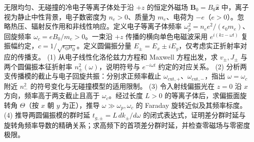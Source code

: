 无限均匀、无碰撞的冷电子等离子体处于沿 \(+z\) 的恒定外磁场 \(\mathbf B_0=B_0\hat{\mathbf z}\) 中，离子视为静止中性背景，电子数密度为 \(n_e>0\)、质量为 \(m_e\)、电荷为 \(-e\)（\(e>0\)）。忽略热压、辐射反作用和非线性响应。定义电子等离子体频率 \(\omega_p^2=n_e e^2/(\epsilon_0m_e)\)、回旋频率 \(\omega_c=eB_0/m_e>0\)。一束沿 \(+z\) 传播的横向单色电磁波采用 \(e^{i(kz-\omega t)}\) 复振幅约定，\(c=1/\sqrt{\epsilon_0\mu_0}\)。定义圆偏振分量 \(E_\pm=E_x\pm iE_y\)，仅考虑实正折射率对应的传播支。
(1) 从电子线性化洛伦兹力方程和 Maxwell 方程出发，求 \(v_\pm,J_\pm\) 与两个圆偏振本征折射率 \(n_\pm^2(\omega)\)，说明符号与 \(e^{-i\omega t}\) 约定的对应关系。
(2) 分析两支传播模的截止与电子回旋共振：分别求正频率截止 \(\omega_{\mathrm{cut},+}\)、\(\omega_{\mathrm{cut},-}\)，指出 \(\omega=\omega_c\) 附近 \(n_-^2\) 的符号变化与无碰撞模型的适用限制。
(3) 令入射线偏振光在 \(z=0\) 沿 \(x\) 方向，频率高于两支截止且高于 \(\omega_c\)。经过长度 \(L>0\) 的等离子体后，求偏振面旋转角 \(\Theta\)（按 \(x\) 朝 \(y\) 为正），推导 \(\omega\gg\omega_p,\omega_c\) 的 Faraday 旋转近似及其频率标度。
(4) 推导两圆偏振模的群时延 \(t_{g,\pm}=L\,dk_\pm/d\omega\) 的闭式表达式，证明差分群时延与旋转角频率导数的精确关系；求高频下的首项差分群时延，并检查零磁场与零密度极限。
